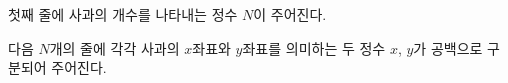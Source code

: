 첫째 줄에 사과의 개수를 나타내는 정수 $N$이 주어진다.

다음 $N$개의 줄에 각각 사과의 $x$좌표와 $y$좌표를 의미하는 두 정수 $x$, $y$가 공백으로 구분되어 주어진다.